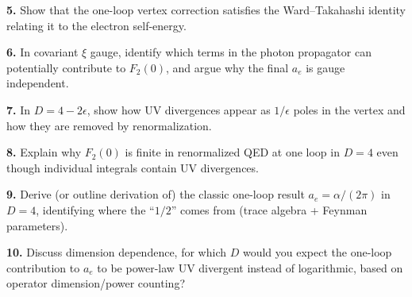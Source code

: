 \documentclass[11pt]{article}
\begin{document}
\begin{tcolorbox}[problem]
\textbf{5.} Show that the one-loop vertex correction satisfies the Ward--Takahashi identity relating it to the electron self-energy.
\end{tcolorbox}

\begin{tcolorbox}[problem]
\textbf{6.} In covariant $\xi$ gauge, identify which terms in the photon propagator can potentially contribute to $F_2(0)$, and argue why the final $a_e$ is gauge independent.
\end{tcolorbox}

\begin{tcolorbox}[problem]
\textbf{7.} In $D=4-2\epsilon$, show how UV divergences appear as $1/\epsilon$ poles in the vertex and how they are removed by renormalization.
\end{tcolorbox}

\begin{tcolorbox}[problem]
\textbf{8.} Explain why $F_2(0)$ is finite in renormalized QED at one loop in $D=4$ even though individual integrals contain UV divergences.
\end{tcolorbox}

\begin{tcolorbox}[problem]
\textbf{9.} Derive (or outline derivation of) the classic one-loop result $a_e=\alpha/(2\pi)$ in $D=4$, identifying where the ``$1/2$'' comes from (trace algebra + Feynman parameters).
\end{tcolorbox}

\begin{tcolorbox}[problem]
\textbf{10.} Discuss dimension dependence, for which $D$ would you expect the one-loop contribution to $a_e$ to be power-law UV divergent instead of logarithmic, based on operator dimension/power counting?
\end{tcolorbox}
\end{document}
